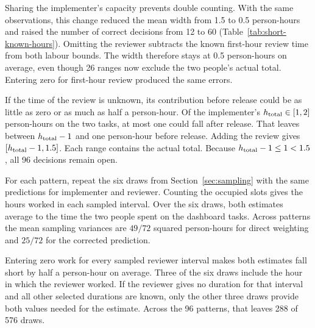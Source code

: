 Sharing the implementer's capacity prevents double counting. With the same observations, this change reduced the mean width from 1.5 to 0.5 person-hours and raised the number of correct decisions from 12 to 60 (Table~\ref{tab:short-known-hours}). Omitting the reviewer subtracts the known first-hour review time from both labour bounds. The width therefore stays at 0.5 person-hours on average, even though 26 ranges now exclude the two people's actual total. Entering zero for first-hour review produced the same errors.

If the time of the review is unknown, its contribution before release could be as little as zero or as much as half a person-hour. Of the implementer's $h_{\rm total}\in[1,2]$ person-hours on the two tasks, at most one could fall after release. That leaves between $h_{\rm total}-1$ and one person-hour before release. Adding the review gives $[h_{\rm total}-1,1.5]$. Each range contains the actual total. Because $h_{\rm total}-1\le1<1.5$, all 96 decisions remain open.

For each pattern, repeat the six draws from Section~\ref{sec:sampling} with the same predictions for implementer and reviewer. Counting the occupied slots gives the hours worked in each sampled interval. Over the six draws, both estimates average to the time the two people spent on the dashboard tasks. Across patterns the mean sampling variances are $49/72$ squared person-hours for direct weighting and $25/72$ for the corrected prediction.

Entering zero work for every sampled reviewer interval makes both estimates fall short by half a person-hour on average. Three of the six draws include the hour in which the reviewer worked. If the reviewer gives no duration for that interval and all other selected durations are known, only the other three draws provide both values needed for the estimate. Across the 96 patterns, that leaves 288 of 576 draws.
